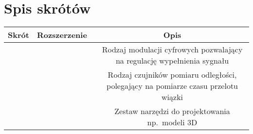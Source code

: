 \section*{Spis skrótów}
\begin{table*}[!ht]
    \begin{tabularx}{\textwidth}{|c|C|C|}\hline
        Skrót & Rozszerzenie\ & Opis\\\hline
         &  & Rodzaj modulacji cyfrowych pozwalający na regulację wypełnienia sygnału\\\hline
         &  & Rodzaj czujników pomiaru odległości, polegający na pomiarze czasu przelotu wiązki\\\hline
         &  & Zestaw narzędzi do projektowania np.~modeli 3D\\\hline
    \end{tabularx}
\end{table*}